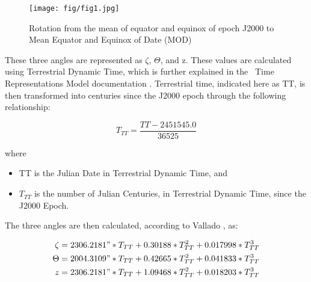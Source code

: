 \begin{figure}[H]
\begin{center}
\texttt{[image: fig/fig1.jpg]}
\caption{Rotation from the mean of equator and
equinox of epoch J2000 to Mean Equator and Equinox of Date (MOD) \cite{Bond1}}
\label{fig:prec}
\end{center}
\end{figure}

These three angles are represented as $\zeta$, $\Theta$, and z. These
values are calculated using Terrestrial Dynamic Time, which is further explained
in the \JEODid\ Time Representations Model documentation \cite{dynenv:TIME}. Terrestrial
time, indicated here as TT, is then transformed into centuries since the
J2000 epoch through the following relationship:

\begin{equation}\label{tt_centuries_since}
T_{TT} = \frac{TT - 2451545.0}{36525}
\end{equation}

where

\begin{itemize}
\item TT is the Julian Date in Terrestrial Dynamic Time, and
\item $T_{TT}$ is the number of Julian Centuries, in Terrestrial
Dynamic Time, since the J2000 Epoch.
\end{itemize}

The three angles are then calculated, according to Vallado \cite{ValladoThird},
as:

\begin{align}\label{precession_angles}
\zeta &= 2306.2181" * T_{TT} + 0.30188 * T^2_{TT} + 0.017998 * T^3_{TT} \\
 \Theta &= 2004.3109" * T_{TT} + 0.42665 * T^2_{TT} + 0.041833 * T^3_{TT} \\
 z &= 2306.2181" * T_{TT} + 1.09468 * T^2_{TT} + 0.018203 * T^3_{TT}
\end{align}



